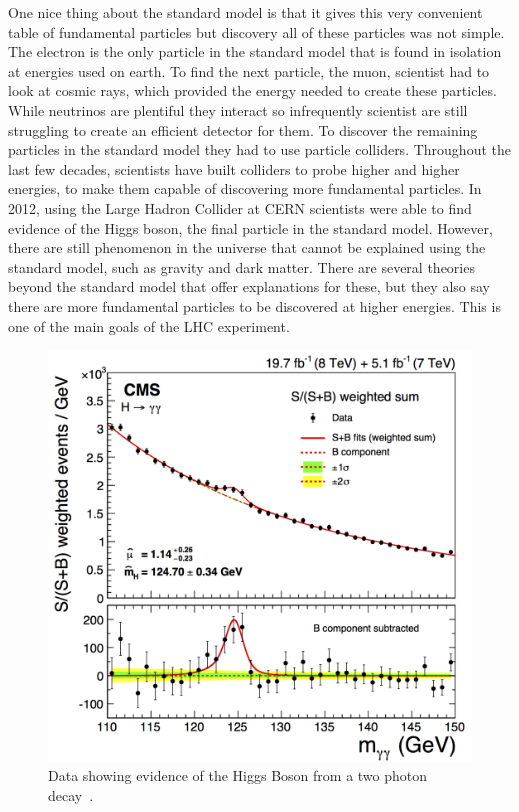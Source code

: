 One nice thing about the standard model is that it gives this very convenient table of fundamental particles but discovery all of these particles was not simple. The electron is the only particle in the standard model that is found in isolation at energies used on earth. To find the next particle, the muon, scientist had to look at cosmic rays, which provided the energy needed to create these particles. While neutrinos are plentiful they interact so infrequently scientist are still struggling to create an efficient detector for them. To discover the remaining particles in the standard model they had to use particle colliders. Throughout the last few decades, scientists have built colliders to probe higher and higher energies, to make them capable of discovering more fundamental particles. In 2012, using the Large Hadron Collider at CERN scientists were able to find evidence of the Higgs boson, the final particle in the standard model. However, there are still phenomenon in the universe that cannot be explained using the standard model, such as gravity and dark matter. There are several theories beyond the standard model that offer explanations for these, but they also say there are more fundamental particles to be discovered at higher energies. This is one of the main goals of the LHC experiment. 

\begin{figure}
\centering
\includegraphics[width=0.6\linewidth]{Figures/higgsmeasurement.png}
\caption{Data showing evidence of the Higgs Boson from a two photon decay~\cite{CMS_Higgs_Discovery}.}
\label{fig:higgs}
\end{figure} 

